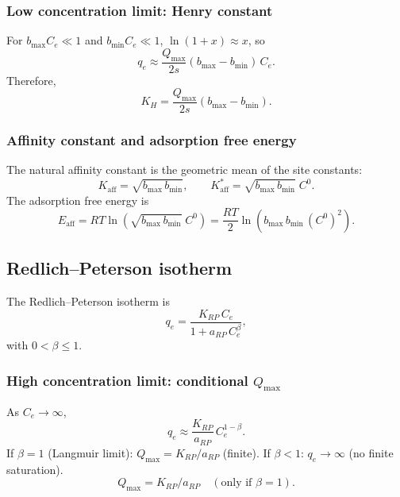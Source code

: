 \documentclass[journal=jacsat,manuscript=article]{achemso}
\begin{document}
\subsubsection{Low concentration limit: Henry constant}

For $b_{\max}C_e \ll 1$ and $b_{\min}C_e \ll 1$,
$\ln(1+x) \approx x$, so
\begin{equation}
	q_e \approx \frac{Q_{\max}}{2s}(b_{\max} - b_{\min})\, C_e.
\end{equation}
Therefore,
\begin{equation}
	\boxed{K_H = \frac{Q_{\max}}{2s}(b_{\max} - b_{\min}).}
\end{equation}

\subsubsection{Affinity constant and adsorption free energy}

The natural affinity constant is the geometric mean of the site constants:
\begin{equation}
	K_{\mathrm{aff}} = \sqrt{b_{\max}\, b_{\min}},
	\qquad
	K_{\mathrm{aff}}^{\ast} = \sqrt{b_{\max}\, b_{\min}}\; C^0.
\end{equation}
The adsorption free energy is
\begin{equation}
	\boxed{
		E_{\mathrm{aff}} = RT\ln\!\left(\sqrt{b_{\max}\, b_{\min}}\; C^0\right)
		= \frac{RT}{2}\ln\!\left(b_{\max}\, b_{\min}\, (C^0)^2\right).
	}
\end{equation}

\subsection{Redlich--Peterson isotherm}
\label{sec:si_redlich_peterson}

The Redlich--Peterson isotherm is
\begin{equation}
	q_e = \frac{K_{RP}\, C_e}{1 + a_{RP}\, C_e^{\beta}},
	\label{eq:si_redlich_peterson}
\end{equation}
with $0 < \beta \leq 1$.

\subsubsection{High concentration limit: conditional $Q_{\max}$}

As $C_e \to \infty$,
\begin{equation}
	q_e \approx \frac{K_{RP}}{a_{RP}}\, C_e^{1-\beta}.
\end{equation}
If $\beta = 1$ (Langmuir limit): $Q_{\max} = K_{RP}/a_{RP}$ (finite).
If $\beta < 1$: $q_e \to \infty$ (no finite saturation).
\begin{equation}
	\boxed{Q_{\max} = K_{RP}/a_{RP} \quad (\text{only if } \beta = 1).}
\end{equation}
\end{document}
